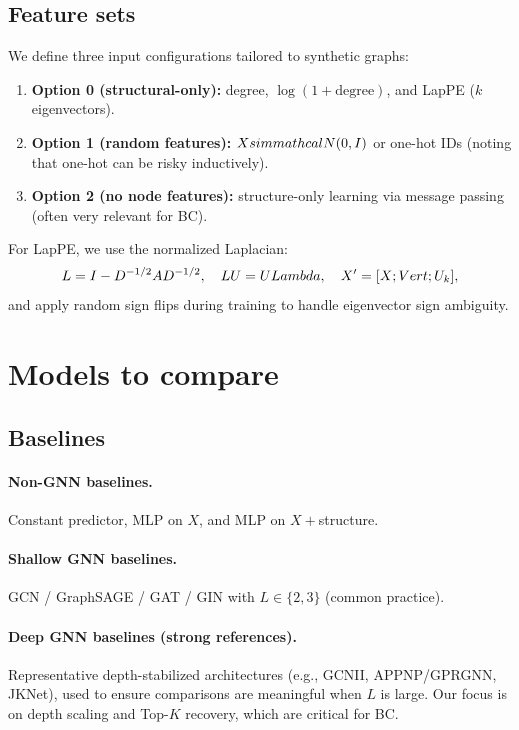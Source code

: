 \documentclass[11pt]{article}
\begin{document}
\subsection{Feature sets}
We define three input configurations tailored to synthetic graphs:
\begin{enumerate}[leftmargin=2em]
\item \textbf{Option 0 (structural-only):} degree, $\log(1+\text{degree})$, and LapPE ($k$ eigenvectors).
\item \textbf{Option 1 (random features):} $X\\sim\\mathcal{N}(0,I)$ or one-hot IDs (noting that one-hot can be risky inductively).
\item \textbf{Option 2 (no node features):} structure-only learning via message passing (often very relevant for BC).
\end{enumerate}
For LapPE, we use the normalized Laplacian:
\[
L=I-D^{-1/2}AD^{-1/2},\quad LU=U\\Lambda,\quad X'=[X\\;\\Vert\\;U_k],
\]
and apply random sign flips during training to handle eigenvector sign ambiguity.

\section{Models to compare}
\subsection{Baselines}
\paragraph{Non-GNN baselines.}
Constant predictor, MLP on $X$, and MLP on $X+$structure.

\paragraph{Shallow GNN baselines.}
GCN / GraphSAGE / GAT / GIN with $L\in\{2,3\}$ (common practice).

\paragraph{Deep GNN baselines (strong references).}
Representative depth-stabilized architectures (e.g., GCNII, APPNP/GPRGNN, JKNet), used to ensure comparisons are meaningful when $L$ is large.
Our focus is on depth scaling and Top-$K$ recovery, which are critical for BC.
\end{document}
